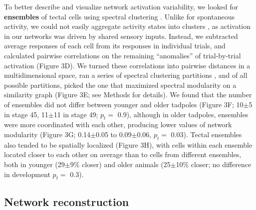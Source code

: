 \documentclass{article}
\begin{document}
To better describe and visualize network activation variability, we looked for \textbf{ensembles} of tectal cells using spectral clustering \citep{thompson2016ensembles}. Unlike for spontaneous activity, we could not easily aggregate activity states into clusters \citep{avitan2017spontaneous}, as activation in our networks was driven by shared sensory inputs. Instead, we subtracted average responses of each cell from its responses in individual trials, and calculated pairwise correlations on the remaining “anomalies” of trial-by-trial activation (Figure 3D). We turned these correlations into pairwise distances in a multidimensional space, ran a series of spectral clustering partitions \citep{ng2002spectral}, and of all possible partitions, picked the one that maximized spectral modularity on a similarity graph \citep{newman2006modularity, gomez2009community} (Figure 3E; see Methods for details). We found that the number of ensembles did not differ between younger and older tadpoles (Figure 3F; 10$\pm$5 in stage 45, 11$\pm$11 in stage 49; $p_t=$ 0.9), although in older tadpoles, ensembles were more coordinated with each other,  producing lower values of network modularity (Figure 3G; 0.14$\pm$0.05 to 0.09$\pm$0.06, $p_t=$ 0.03). Tectal ensembles also tended to be spatially localized (Figure 3H), with cells within each ensemble located closer to each other on average than to cells from different ensembles, both in younger (29$\pm$9\% closer) and older animals (25$\pm$10\% closer; no difference in development $p_t=$ 0.3).

\subsection*{Network reconstruction}
\end{document}
